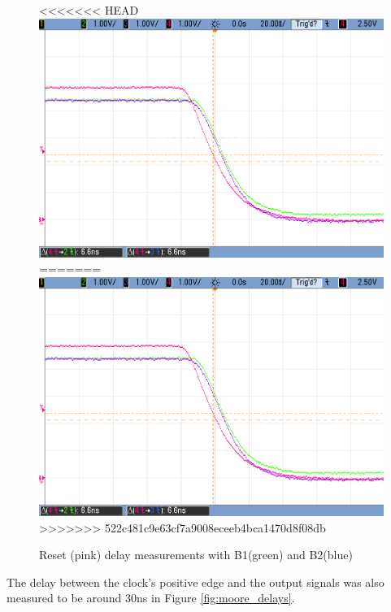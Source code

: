 \begin{figure}[H]
    \begin{center}
<<<<<<< HEAD
        \includegraphics[scale=0.3]{../Exercise1/Moore/report/images/e3e1_nreset_delay.png}
=======
        \includegraphics[width=0.75\linewidth]{./images/e3e1_nreset_delay.png}
>>>>>>> 522c481c9e63cf7a9008eceeb4bca1470d8f08db
        \caption{Reset (pink) delay measurements with B1(green) and B2(blue)}
        \label{fig:moore_nres_delay}
    \end{center}
\end{figure}

The delay between the clock's positive edge and the output signals was also measured to be around 30ns in Figure \ref{fig:moore_delays}.

